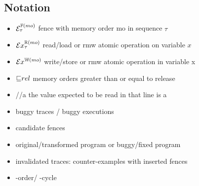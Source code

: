 %
%
%
%

\subsection{Notation}
\begin{itemize}
	\item $\ordfences{mo}_\tau$ \quad fence with memory order mo in sequence $\tau$
	\item $\ordreads{x}{mo}_\tau$ \quad read/load or rmw atomic operation on variable $x$
	\item $\ordwrites{x}{mo}$ \qquad write/store or rmw atomic operation in variable x
	\item $\mole rel$ \qquad memory orders greater than or equal to release
	\item \color{olive}//a \color{black} \qquad the value expected to be read in that line is a
	\item buggy traces / buggy executions
	\item candidate fences
	\item original/transformed program or buggy/fixed program
	\item invalidated traces: counter-examples with inserted fences
	\item \setSC-order/ \setSC-cycle
\end{itemize}